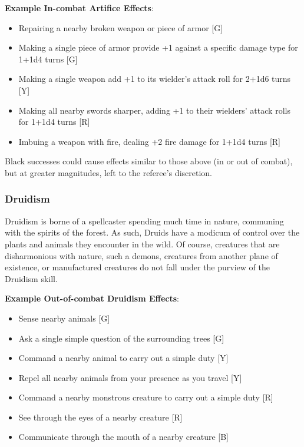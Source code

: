\documentclass[oneside]{book}
\begin{document}
\begin{multicols}{2}
\textbf{Example In-combat Artifice Effects}: 
	\begin{itemize}
		\setlength{\itemsep}{0cm}%
  		\setlength{\parskip}{0cm}%
  		\item{ \small Repairing a nearby broken weapon or piece of armor [G]}
  		\item{ \small Making a single piece of armor provide +1 against a specific damage type for 1+1d4 turns [G]}
  		\item{ \small Making a single weapon add +1 to its wielder's attack roll for 2+1d6 turns [Y]}
  		\item{ \small Making all nearby swords sharper, adding +1 to their wielders' attack rolls for 1+1d4 turns [R]}
  		\item{ \small Imbuing a weapon with fire, dealing +2 fire damage for 1+1d4 turns [R]}
	\end{itemize}
Black successes could cause effects similar to those above (in or out of combat), but at greater magnitudes, left to the referee's discretion.

\subsubsection{Druidism}
Druidism is borne of a spellcaster spending much time in nature, communing with the spirits of the forest. As such, Druids have a modicum of control over the plants and animals they encounter in the wild. Of course, creatures that are disharmonious with nature, such a demons, creatures from another plane of existence, or manufactured creatures do not fall under the purview of the Druidism skill.

\textbf{Example Out-of-combat Druidism Effects}: 
	\begin{itemize}
		\setlength{\itemsep}{0cm}%
  		\setlength{\parskip}{0cm}%
		\item{ \small Sense nearby animals [G]}
		\item{ \small Ask a single simple question of the surrounding trees [G]}
		\item{ \small Command a nearby animal to carry out a simple duty [Y]}
		\item{ \small Repel all nearby animals from your presence as you travel [Y]}
		\item{ \small Command a nearby monstrous creature to carry out a simple duty [R]}
		\item{ \small See through the eyes of a nearby creature [R]}
		\item{ \small Communicate through the mouth of a nearby creature [B]}
	\end{itemize}
	

\end{multicols}
\end{document}
